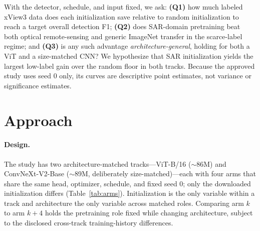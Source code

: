 \documentclass[10pt,twocolumn,letterpaper]{article}
\begin{document}
With the detector, schedule, and input fixed, we ask:
\textbf{(Q1)} how much labeled xView3 data does each initialization save
relative to random initialization to reach a target overall detection F1;
\textbf{(Q2)} does SAR-domain pretraining beat both optical remote-sensing and
generic ImageNet transfer in the scarce-label regime; and \textbf{(Q3)} is any
such advantage \emph{architecture-general}, holding for both a ViT and a
size-matched CNN? We hypothesize that SAR initialization yields the largest
low-label gain over the random floor in both tracks. Because the approved
study uses seed 0 only, its curves are descriptive point estimates, not
variance or significance estimates.

\section{Approach}
\label{sec:approach}

\paragraph{Design.} The study has two architecture-matched tracks---ViT-B/16
($\sim$86M) and ConvNeXt-V2-Base ($\sim$89M, deliberately size-matched)---each
with four arms that share the same head, optimizer, schedule, and fixed seed
0; only the downloaded initialization differs (Table~\ref{tab:arms}).
Initialization is the only variable within a track and architecture the only
variable across matched roles. Comparing arm $k$ to arm $k{+}4$ holds the
pretraining role fixed while changing architecture, subject to the disclosed
cross-track training-history differences.
\end{document}
